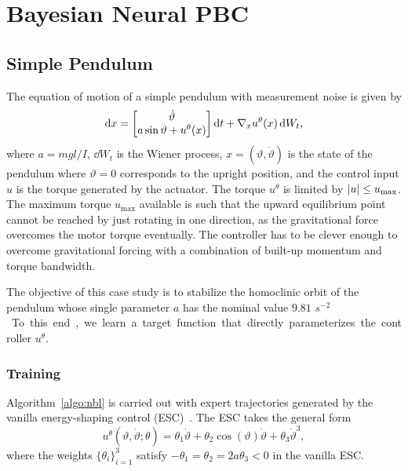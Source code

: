 
\section{Bayesian Neural PBC}

\subsection{Simple Pendulum}

The equation of motion of a simple pendulum with measurement noise is given by
%
\begin{equation}
    \operatorname{d}\! x = \begin{bmatrix}
        \dot{\vartheta} \\ 
        a \sin{\vartheta} + u^\theta(x)
    \end{bmatrix} \operatorname{d}\! t+ \nabla_x u^\theta(x) \operatorname{d}\! W_t,
    \label{eq:pendulum_sde}
\end{equation}
%
where $a=mgl/I$, $\dd W_t$ is the Wiener process, $x = (\vartheta,
\dot{\vartheta})$ is the state of the pendulum where $\vartheta = 0$ corresponds
to the upright position, and the control input $u$ is the torque generated by
the actuator. 
%
The torque \(u^\theta\) is limited by \(\left|{u}\right| \leq u_{\textrm{max}}\).
%
The maximum torque $u_{\textrm{max}}$ available is such that the upward
equilibrium point cannot be reached by just rotating in one direction, as the
gravitational force overcomes the motor torque eventually. The controller has to
be clever enough to overcome gravitational forcing with a combination of
built-up momentum and torque bandwidth.

The objective of this case study is to stabilize the homoclinic orbit of the
pendulum whose single parameter $a$ has the nominal value $9.81$
\unit{$s^{-2}$}. To this end, we learn a target function that directly
parameterizes the controller $u^\theta$.

\subsubsection{Training} 
Algorithm~\ref{algo:nbl} is carried out with expert
trajectories generated by the vanilla energy-shaping control
(ESC)~\cite{underactuated}. The ESC takes the general form
%
\begin{equation}
    u^\theta(\vartheta, \dot{\vartheta}; \theta) = \theta_1 \dot{\vartheta} + \theta_2 \cos{(\vartheta)} \dot{\vartheta} + \theta_3 \dot{\vartheta}^3,
    \label{eq:pendulum_esc}
\end{equation}
%
where the weights $\{\theta_i\}_{i=1}^3$ satisfy $-\theta_1 = \theta_2 = 2a
\theta_3 < 0$ in the vanilla ESC. 

